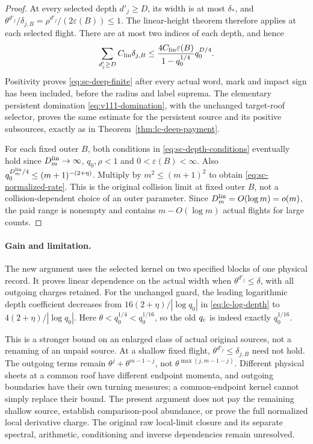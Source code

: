 \begin{proof}
At every selected depth $d'_j\ge D$, its width is at most
$\delta_*$, and
$\theta^{d'_j}/\delta_{j,B}=\rho^{d'_j}/(2\varepsilon(B))\le1$.
The linear-height theorem therefore applies at each selected flight.
There are at most two indices of each depth, and hence
\[
 \sum_{d'_j\ge D}C_{\rm lin}\delta_{j,B}
 \le \frac{4C_{\rm lin}\varepsilon(B)}{1-q_0^{1/4}}q_0^{D/4}.
\]
Positivity proves \eqref{eq:sc-deep-finite} after every actual word,
mark and impact sign has been included, before the radius and label
suprema.  The elementary persistent domination
\eqref{eq:v111-domination}, with the unchanged target-roof selector,
proves the same estimate for the persistent source and its positive
subsources, exactly as in Theorem~\ref{thm:lc-deep-payment}.

For each fixed outer $B$, both conditions in
\eqref{eq:sc-depth-conditions} eventually hold since
$D_m^{\rm lin}\to\infty$, $q_0,\rho<1$ and
$0<\varepsilon(B)<\infty$.  Also
$q_0^{D_m^{\rm lin}/4}\le(m+1)^{-(2+\eta)}$.
Multiply by $m^2\le(m+1)^2$ to obtain
\eqref{eq:sc-normalized-rate}.  This is the original collision limit
at fixed outer $B$, not a collision-dependent choice of an outer
parameter.  Since $D_m^{\rm lin}=O(\log m)=o(m)$, the paid range is
nonempty and contains $m-O(\log m)$ actual flights for large counts.
\end{proof}

\paragraph{Gain and limitation.}
The new argument uses the selected kernel on two specified blocks of
one physical record.  It proves linear dependence on the actual width
when $\theta^{d'_j}\le\delta$, with all outgoing charges retained.
For the unchanged guard, the leading logarithmic depth coefficient
decreases from $16(2+\eta)/|\log q_0|$ in
\eqref{eq:lc-log-depth} to $4(2+\eta)/|\log q_0|$.
Here $\theta<q_0^{1/4}<q_0^{1/16}$, so the old $q_{\rm c}$ is
indeed exactly $q_0^{1/16}$.

This is a stronger bound on an enlarged class of actual original
sources, not a renaming of an unpaid source.  At a shallow fixed
flight, $\theta^{d'_j}\le\delta_{j,B}$ need not hold.  The outgoing
terms remain $\theta^j+\theta^{m-1-j}$, not
$\theta^{\max(j,m-1-j)}$.  Different physical sheets at a common roof
have different endpoint momenta, and outgoing boundaries have their
own turning measures; a common-endpoint kernel cannot simply replace
their bound.  The present argument does not pay the remaining shallow
source, establish comparison-pool abundance, or prove the full
normalized local derivative charge.  The original raw local-limit
closure and its separate spectral, arithmetic, conditioning and inverse
dependencies remain unresolved.
